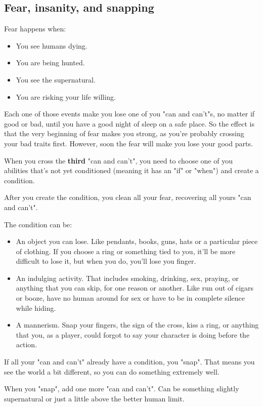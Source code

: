 \documentclass[11pt]{article}
\begin{document}
\subsection{Fear, insanity, and snapping}
\label{sec:org6f20fb4}
Fear happens when:
\begin{itemize}
\item You see humans dying.
\item You are being hunted.
\item You see the supernatural.
\item You are risking your life willing.
\end{itemize}

Each one of those events make you lose one of you "can and can't"s, no matter if good or bad, until you have a good night of sleep on a safe place. So the effect is that the very beginning of fear makes you strong, as you're probably crossing your bad traits first. However, soon the fear will make you lose your good parts.

When you cross the \textbf{third} "can and can't", you need to choose one of you abilities that's not yet conditioned (meaning it has an "if" or "when") and create a condition.

After you create the condition, you clean all your fear, recovering all yours "can and can't".

The condition can be:
\begin{itemize}
\item An object you can lose. Like pendants, books, guns, hats or a particular piece of clothing. If you choose a ring or something tied to you, it'll be more difficult to lose it, but when you do, you'll lose you finger.
\item An indulging activity. That includes smoking, drinking, sex, praying, or anything that you can skip, for one reason or another. Like run out of cigars or booze, have no human around for sex or have to be in complete silence while hiding.
\item A mannerism. Snap your fingers, the sign of the cross, kiss a ring, or anything that you, as a player, could forgot to say your character is doing before the action.
\end{itemize}

If all your "can and can't" already have a condition, you "snap". That means you see the world a bit different, so you can do something extremely well.

When you "snap", add one more "can and can't". Can be something slightly supernatural or just a little above the better human limit.
\end{document}
